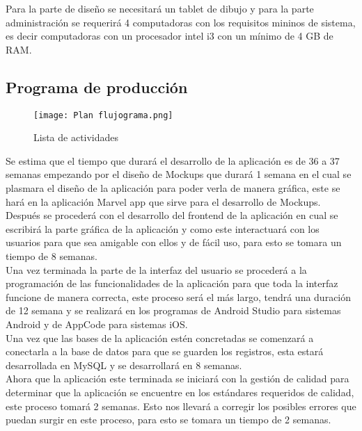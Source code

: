 \documentclass[11pt]{article}
\begin{document}
        Para la parte de diseño se necesitar\'a un tablet de dibujo y para la parte administración se requerirá 4 computadoras con los requisitos mininos de sistema, es decir computadoras con un procesador intel i3 con un mínimo de 4 GB de RAM.
        
    \subsection{Programa de producci\'on}
        \begin{figure}[H]
            \centering
            \texttt{[image: Plan flujograma.png]}
            \caption{Lista de actividades}
            \label{actividades}
        \end{figure}
    \newpage
   Se estima que el tiempo que durar\'a el desarrollo de la aplicación es de 36 a 37 semanas empezando por el diseño de Mockups que durar\'a 1 semana en el cual se plasmara el diseño de la aplicaci\'on para poder verla de manera gráfica, este se har\'a en la aplicación Marvel app que sirve para el desarrollo de Mockups.\\
   
   Después se proceder\'a con el desarrollo del frontend de la aplicaci\'on en cual se escribir\'a la parte gráfica de la aplicación y como este interactuará con los usuarios para que sea amigable con ellos y de fácil uso, para esto se tomara un tiempo de 8 semanas.\\
   
   Una vez terminada la parte de la interfaz del usuario se proceder\'a a la programación de las funcionalidades de la aplicación para que toda la interfaz funcione de manera correcta, este proceso ser\'a el m\'as largo, tendr\'a una duraci\'on de 12 semana y se realizar\'a en los programas de Android Studio para sistemas Android y de AppCode para sistemas iOS.\\
   
   Una vez que las bases de la aplicación estén concretadas se comenzar\'a a conectarla a la base de datos para que se guarden los registros, esta estar\'a desarrollada en MySQL y se desarrollar\'a en 8 semanas.\\
   
   Ahora que la aplicación este terminada se iniciar\'a con la gesti\'on de calidad para determinar que la aplicaci\'on se encuentre en los estándares requeridos de calidad, este proceso tomar\'a 2 semanas. Esto nos llevar\'a a corregir los posibles errores que puedan surgir en este proceso, para esto se tomara un tiempo de 2 semanas.\\
   
\end{document}
